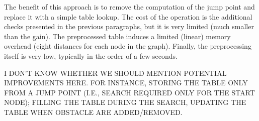 The benefit of this approach is to remove the computation of the jump point 
and replace it with a simple table lookup.  
The cost of the operation is the additional checks 
presented in the previous paragraphs, 
but it is very limited (much smaller than the gain).  
The preprocessed table induces a limited (linear) memory overhead 
(eight distances for each node in the graph).  
Finally, the preprocessing itself is very low, 
typically in the order of a few seconds.  

I DON'T KNOW WHETHER WE SHOULD MENTION POTENTIAL IMPROVEMENTS HERE.  
FOR INSTANCE, STORING THE TABLE ONLY FROM A JUMP POINT 
(I.E., SEARCH REQUIRED ONLY FOR THE START NODE); 
FILLING THE TABLE DURING THE SEARCH, 
UPDATING THE TABLE WHEN OBSTACLE ARE ADDED/REMOVED.  
